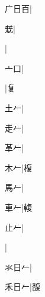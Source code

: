 \begin{multicols}{2}
{{\cjk{}广日百}|{}\par
{\cjk{}{\cnsym{}　}{\cnsym{}　}兓}|{}\par
{}|{}\par
{\cjk{}{\cnsym{}　}亠口}|{}\par
{}|{\cjk{}复}\par
{\cjk{}{\cnsym{}　}土{\cnxHanaA{}𠂉}}|{}\par
{\cjk{}{\cnsym{}　}走{\cnxHanaA{}𠂉}}|{}\par
{\cjk{}{\cnsym{}　}革{\cnxHanaA{}𠂉}}|{}\par
{\cjk{}{\cnsym{}　}木{\cnxHanaA{}𠂉}}|{\cjk{}椱}\par
{\cjk{}{\cnsym{}　}馬{\cnxHanaA{}𠂉}}|{}\par
{\cjk{}{\cnsym{}　}車{\cnxHanaA{}𠂉}}|{\cjk{}輹}\par
{\cjk{}{\cnsym{}　}止{\cnxHanaA{}𠂉}}|{}\par
{}|{}\par
{\cjk{}氺日{\cnxHanaA{}𠂉}}|{}\par
{\cjk{}禾日{\cnxHanaA{}𠂉}}|{\cjk{}馥}\par
}
\end{multicols}
